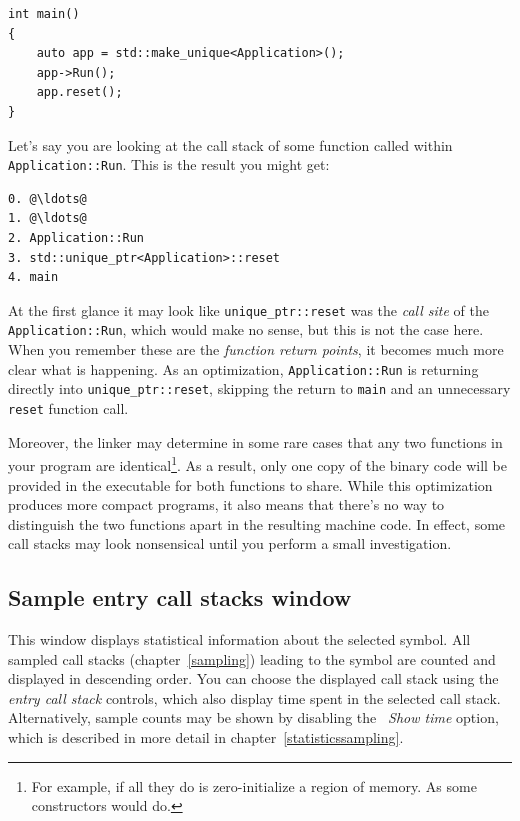 \documentclass[hidelinks,titlepage,a4paper,twoside]{article}
\begin{document}
\begin{lstlisting}
int main()
{
    auto app = std::make_unique<Application>();
    app->Run();
    app.reset();
}
\end{lstlisting}

Let's say you are looking at the call stack of some function called within \texttt{Application::Run}. This is the result you might get:

\begin{lstlisting}
0. @\ldots@
1. @\ldots@
2. Application::Run
3. std::unique_ptr<Application>::reset
4. main
\end{lstlisting}

At the first glance it may look like \texttt{unique\_ptr::reset} was the \emph{call site} of the \texttt{Application::Run}, which would make no sense, but this is not the case here. When you remember these are the \emph{function return points}, it becomes much more clear what is happening. As an optimization, \texttt{Application::Run} is returning directly into \texttt{unique\_ptr::reset}, skipping the return to \texttt{main} and an unnecessary \texttt{reset} function call.

Moreover, the linker may determine in some rare cases that any two functions in your program are identical\footnote{For example, if all they do is zero-initialize a region of memory. As some constructors would do.}. As a result, only one copy of the binary code will be provided in the executable for both functions to share. While this optimization produces more compact programs, it also means that there's no way to distinguish the two functions apart in the resulting machine code. In effect, some call stacks may look nonsensical until you perform a small investigation.

\subsection{Sample entry call stacks window}
\label{sampleparents}

This window displays statistical information about the selected symbol. All sampled call stacks (chapter~\ref{sampling}) leading to the symbol are counted and displayed in descending order. You can choose the displayed call stack using the \emph{entry call stack} controls, which also display time spent in the selected call stack. Alternatively, sample counts may be shown by disabling the \emph{\faStopwatch{}~Show time} option, which is described in more detail in chapter~\ref{statisticssampling}.
\end{document}
